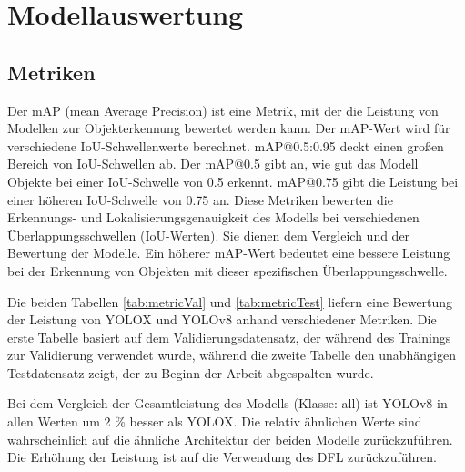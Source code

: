 \chapter{Modellauswertung}\label{chap:metrics}
\section{Metriken}
Der mAP (mean Average Precision) ist eine Metrik, mit der die Leistung von Modellen zur Objekterkennung bewertet werden kann. Der mAP-Wert wird für verschiedene IoU-Schwellenwerte berechnet. mAP@0.5:0.95 deckt einen großen Bereich von IoU-Schwellen ab. Der mAP@0.5 gibt an, wie gut das Modell Objekte bei einer IoU-Schwelle von 0.5 erkennt. mAP@0.75 gibt die Leistung bei einer höheren IoU-Schwelle von 0.75 an. Diese Metriken bewerten die Erkennungs- und Lokalisierungsgenauigkeit des Modells bei verschiedenen Überlappungsschwellen (IoU-Werten). Sie dienen dem Vergleich und der Bewertung der Modelle. Ein höherer mAP-Wert bedeutet eine bessere Leistung bei der Erkennung von Objekten mit dieser spezifischen Überlappungsschwelle.

Die beiden Tabellen \ref{tab:metricVal} und \ref{tab:metricTest} liefern eine Bewertung der Leistung von YOLOX und YOLOv8 anhand verschiedener Metriken. Die erste Tabelle basiert auf dem Validierungsdatensatz, der während des Trainings zur Validierung verwendet wurde, während die zweite Tabelle den unabhängigen Testdatensatz zeigt, der zu Beginn der Arbeit abgespalten wurde.

Bei dem Vergleich der Gesamtleistung des Modells (Klasse: all) ist YOLOv8 in allen Werten um 2 \% besser als YOLOX. Die relativ ähnlichen Werte sind wahrscheinlich auf die ähnliche Architektur der beiden Modelle zurückzuführen. Die Erhöhung der Leistung ist auf die Verwendung des DFL zurückzuführen.

